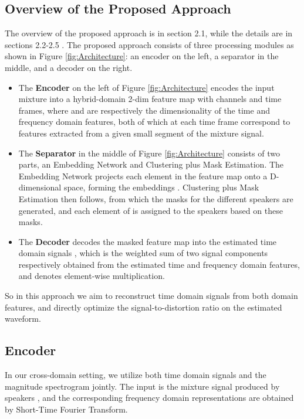 \documentclass[a4paper]{article}
\begin{document}
\subsection{Overview of the Proposed Approach}
The overview of the proposed approach is in section 2.1, while the details are in sections 2.2-2.5 .
The proposed approach consists of three processing modules as shown in Figure \ref{fig:Architecture}: an encoder on the left, a separator in the middle, and a decoder on the right. 
\begin{itemize}
    \item The \textbf{Encoder} on the left of Figure \ref{fig:Architecture} encodes the input mixture  into a hybrid-domain 2-dim feature map  with  channels and  time frames, where  and  are respectively the dimensionality of the time and frequency domain features, both of which at each time frame correspond to features extracted from a given small segment of the mixture signal.

\item The \textbf{Separator} in the middle of Figure \ref{fig:Architecture} consists of two parts, an Embedding Network and Clustering plus Mask Estimation. The Embedding Network projects each element in the feature map  onto a D-dimensional space, forming the embeddings . Clustering plus Mask Estimation then follows, from which the masks  for the different speakers are generated, and each element of  is assigned to the speakers based on these masks.
    
    

    \item The \textbf{Decoder} decodes the masked feature map into the estimated time domain signals , which is the weighted sum of two signal components respectively obtained from the estimated time and frequency domain features, and  denotes element-wise multiplication.
    
\end{itemize}

So in this approach we aim to reconstruct time domain signals from both domain features, and directly optimize the signal-to-distortion ratio on the estimated waveform.


\subsection{Encoder}

In our cross-domain setting, we utilize both time domain signals and the magnitude spectrogram jointly. The input is the mixture signal  produced by  speakers , and the corresponding frequency domain representations are obtained by Short-Time Fourier Transform.
\end{document}
